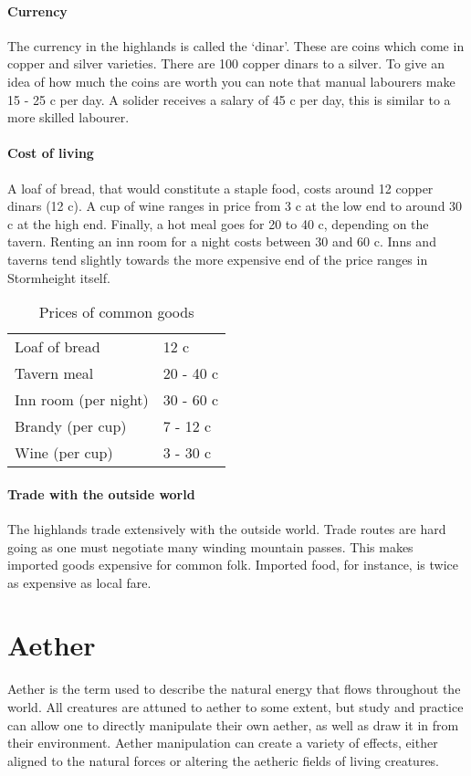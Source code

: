 \documentclass[a4paper,11pt,oneside]{book}
\begin{document}
\subsubsection{Currency}
The currency in the highlands is called the `dinar'. These are coins which come in copper and silver varieties. There are 100 copper dinars to a silver. To give an idea of how much the coins are worth you can note that manual labourers make 15 - 25 c per day. A solider receives a salary of 45 c per day, this is similar to a more skilled labourer.

\subsubsection{Cost of living}
A loaf of bread, that would constitute a staple food, costs around 12 copper dinars (12 c). A cup of wine ranges in price from 3 c at the low end to around 30 c at the high end. Finally, a hot meal goes for 20 to 40 c, depending on the tavern. Renting an inn room for a night costs between 30 and 60 c. Inns and taverns tend slightly towards the more expensive end of the price ranges in Stormheight itself.  

\begin{table}[ht!]
	\centering
	\begin{tabular}{|l|l|}
		\hline
		Loaf of bread & 12 c \\
		Tavern meal & 20 - 40 c \\
		Inn room (per night) & 30 - 60 c \\
		Brandy (per cup) & 7 - 12 c \\
		Wine (per cup) & 3 - 30 c \\
		\hline		
	\end{tabular}
\caption{Prices of common goods}
\end{table}

\subsubsection{Trade with the outside world}
The highlands trade extensively with the outside world. Trade routes are hard going as one must negotiate many winding mountain passes. This makes imported goods expensive for common folk. Imported food, for instance, is twice as expensive as local fare. 

  



\chapter{Aether}
Aether is the term used to describe the natural energy that flows throughout the world. All creatures are attuned to aether to some extent, but study and practice can allow one to directly manipulate their own aether, as well as draw it in from their environment. Aether manipulation can create a variety of effects, either aligned to the natural forces or altering the aetheric fields of living creatures.
\end{document}
